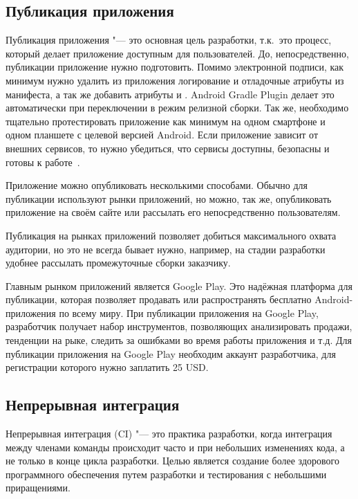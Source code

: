 \subsection{Публикация приложения}
\label{subsec:publish}

Публикация приложения "--- это основная цель разработки, т.к.\ это процесс, который делает приложение доступным для пользователей.
До, непосредственно, публикации приложение нужно подготовить.
Помимо электронной подписи, как минимум нужно удалить из приложения логирование  и отладочные атрибуты из манифеста, а так же добавить атрибуты  и .
Android Gradle Plugin делает это автоматически при переключении в режим релизной сборки.
Так же, необходимо тщательно протестировать приложение как минимум на одном смартфоне и одном планшете с целевой версией Android.
Если приложение зависит от внешних сервисов, то нужно убедиться, что сервисы доступны, безопасны и готовы к работе~\cite{android:publish}.

Приложение можно опубликовать несколькими способами.
Обычно для публикации используют рынки приложений, но можно, так же, опубликовать приложение на своём сайте или рассылать его непосредственно пользователям.

Публикация на рынках приложений позволяет добиться максимального охвата аудитории, но это не всегда бывает нужно, например, на стадии разработки удобнее рассылать промежуточные сборки заказчику.

Главным рынком приложений является Google Play.
Это надёжная платформа для публикации, которая позволяет продавать или распространять бесплатно Android-приложения по всему миру.
При публикации приложения на Google Play, разработчик получает набор инструментов, позволяющих анализировать продажи, тенденции на рыке, следить за ошибками во время работы приложения и т.д.
Для публикации приложения на Google Play необходим аккаунт разработчика, для регистрации которого нужно заплатить 25 USD\@.

\subsection{Непрерывная интеграция}
\label{subsec:ci}

Непрерывная интеграция (CI) "--- это практика разработки, когда интеграция между членами команды происходит часто и при небольших изменениях кода, а не только в конце цикла разработки.
Целью является создание более здорового программного обеспечения путем разработки и тестирования с небольшими приращениями.

